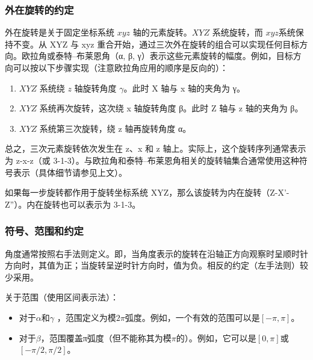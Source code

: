 \subsubsection{外在旋转的约定}

外在旋转是关于固定坐标系统 $xyz$ 轴的元素旋转。$XYZ$ 系统旋转，而 $xyz$系统保持不变。从 XYZ 与 xyz 重合开始，通过三次外在旋转的组合可以实现任何目标方向。欧拉角或泰特–布莱恩角（α, β, γ）表示这些元素旋转的幅度。例如，目标方向可以按以下步骤实现（注意欧拉角应用的顺序是反向的）：
\begin{enumerate}
\item $XYZ$ 系统绕 $z$ 轴旋转角度 $\gamma$。此时 X 轴与 x 轴的夹角为 γ。
\item $XYZ$ 系统再次旋转，这次绕 x 轴旋转角度 β。此时 Z 轴与 z 轴的夹角为 β。
\item $XYZ$ 系统第三次旋转，绕 z 轴再旋转角度 α。
\end{enumerate}
总之，三次元素旋转依次发生在 z、x 和 z 轴上。实际上，这个旋转序列通常表示为 z-x-z（或 3-1-3）。与欧拉角和泰特–布莱恩角相关的旋转轴集合通常使用这种符号表示（具体细节请参见上文）。

如果每一步旋转都作用于旋转坐标系统 XYZ，那么该旋转为内在旋转（Z-X'-Z''）。内在旋转也可以表示为 3-1-3。
\subsubsection{符号、范围和约定}
角度通常按照右手法则定义。即，当角度表示的旋转在沿轴正方向观察时呈顺时针方向时，其值为正；当旋转呈逆时针方向时，值为负。相反的约定（左手法则）较少采用。

关于范围（使用区间表示法）：

\begin{itemize}
\item 对于$\alpha$和$\gamma$ ，范围定义为模$2\pi$弧度。例如，一个有效的范围可以是$[ -\pi,\pi]$。
\item 对于$\beta$，范围覆盖π弧度（但不能称其为模$\pi$的）。例如，它可以是$[0,\pi]$或$[-\pi/2,\pi/2]$。
\end{itemize}